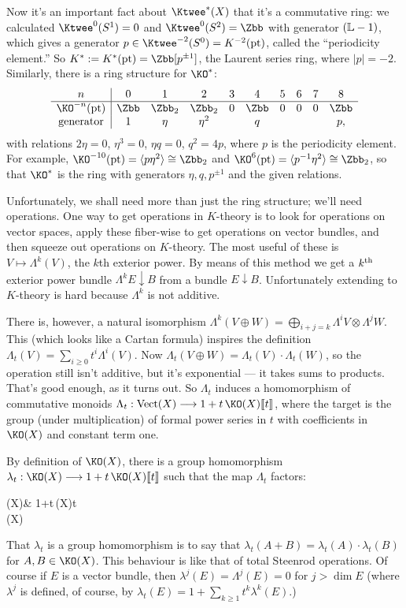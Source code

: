 Now it's an important fact about $\Ktwee^* (X)$ that it's a commutative ring: we calculated $\Ktwee^0 (S^1) = 0$ and $\Ktwee^0 (S^2) = \Zbb$ with generator $(\mathbb{L} - 1)$, which gives a generator $p \in \Ktwee^{-2} (S^0) = K^{-2} (\ptspace)$, called the ``periodicity element.''  So $K^* \eqdef K^* (\ptspace) = \Zbb[p^{\pm 1}]$, the Laurent series ring, where $|p| = -2$.  Similarly, there is a ring structure for $\KO^*$:
\[
\begin{array}{c|ccccccccc}
n & 0 & 1 & 2 & 3 & 4 & 5 & 6 & 7 & 8 \\
\hline
\KO^{-n} (\ptspace) & \Zbb & \Zbb_2 & \Zbb_2 & 0 & \Zbb & 0 & 0 & 0 & \Zbb \\
\mathrm{generator} & 1 & \eta & \eta^2 & & q & & & & p,
\end{array}
\]
with relations $2\eta = 0$, $\eta^3 = 0$, $\eta q = 0$, $q^2 = 4p$, where $p$ is the periodicity element. For example, $\KO^{-10}(\ptspace) = \langle p\eta^2 \rangle \cong \Zbb_2$ and $\KO^{6}(\ptspace) = \langle p^{-1}\eta^2 \rangle \cong \Zbb_2$, so that $\KO^*$ is the ring with generators $\eta,q,p^{\pm1}$ and the given relations.

Unfortunately, we shall need more than just the ring structure; we'll need operations.  One way to get operations in $K$-theory is to look for operations on vector spaces, apply these fiber-wise to get operations on vector bundles, and then squeeze out operations on $K$-theory.  The most useful of these is $V \mapsto \Lambda^k(V)$, the $k$th exterior power.  By means of this method we get a $k^\textup{th}$ exterior power bundle $\Lambda^k E \downarrow B$ from a bundle $E\downarrow B$.  Unfortunately extending to $K$-theory is hard because $\Lambda^k$ is not additive.

There is, however, a natural isomorphism $\Lambda^k(V \oplus W) = \bigoplus_{i+j = k} \Lambda^i V \otimes \Lambda^j W$.  This (which looks like a Cartan formula) inspires the definition $\Lambda_t(V) = \sum_{i \ge 0} t^i \Lambda^i(V)$.  Now $\Lambda_t(V \oplus W) = \Lambda_t(V) \cdot \Lambda_t(W)$, so the operation still isn't additive, but it's exponential --- it takes sums to products.  That's good enough, as it turns out.  So $\Lambda_t$ induces a homomorphism of commutative monoids $\Lambda_t: \Vect(X) \to 1 + t\,\KO(X)\llbracket t \rrbracket$, where the target is the group (under multiplication) of formal power series in $t$ with coefficients in $\KO(X)$ and constant term one.

By definition of $\KO(X)$, there is a group homomorphism $\lambda_t: \KO(X) \to 1+t\,\KO(X) \llbracket t \rrbracket$ such that the map $\Lambda_t$ factors:
\begin{ctikzcd}
\Vect(X)\rar["\Lambda_t"]\dar & 1+t\,\KO(X)\llbracket t \rrbracket\\
\KO(X)\urar["\lambda_t"']
\end{ctikzcd}
That $\lambda_t$ is a group homomorphism is to say that
$\lambda_t(A + B) = \lambda_t(A) \cdot \lambda_t(B)$
for $A, B \in \KO(X)$. This behaviour is like that of total Steenrod operations.  Of course if $E$ is a vector bundle, then $\lambda^j(E) = \Lambda^j(E) = 0$ for $j > \dim E$ (where $\lambda^j$ is defined, of course, by $\lambda_t(E) = 1 + \sum_{k \ge 1} t^k \lambda^k(E)$.)

